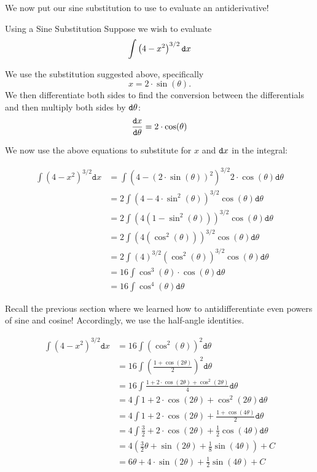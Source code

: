 We now put our sine substitution to use to evaluate an antiderivative!
\begin{example}{Using a Sine Substitution}
 Suppose we wish to evaluate $$\int \left( 4-x^2 \right)^{3/2} \mathop{}\!\mathtt{d} x$$
  
We use the substitution suggested above, specifically $$x=2\cdot \sin(\theta).$$  We then differentiate both sides to find the conversion between the differentials and then multiply both sides by $\mathop{}\!\mathtt{d} \theta$: $$ \frac{\mathop{}\!\mathtt{d} x}{\mathop{}\!\mathtt{d} \theta}=2 \cdot \cos(\theta) $$

We now use the above equations to substitute for $x$ and $\mathop{}\!\mathtt{d} x$ in the integral:

\begin{align*} \int \left( 4-x^2 \right)^{3/2} \mathtt{d}x &=\int \left( 4-(2\cdot \sin(\theta))^2 \right)^{3/2} 2\cdot \cos(\theta)\mathtt{d}\theta \\
&=2 \int \left(4-4\cdot \sin^2(\theta)\right)^{3/2}\cos(\theta) \mathtt{d}\theta \\
&=2 \int \left(4\left(1-\sin^2(\theta)\right)\right)^{3/2}\cos(\theta) \mathtt{d}\theta \\
&=2 \int \left(4\left(\cos^2(\theta)\right)\right)^{3/2}\cos(\theta) \mathtt{d}\theta \\
&=2 \int \left(4\right)^{3/2}\left(\cos^2(\theta)\right)^{3/2}\cos(\theta) \mathtt{d}\theta
\\
&=16 \int \cos^3(\theta)\cdot \cos(\theta) \mathtt{d}\theta
\\
&=16 \int \cos^4(\theta) \mathtt{d}\theta
\end{align*}

Recall the previous section where we learned how to antidifferentiate even powers of sine and cosine!  Accordingly, we use the half-angle identities.

\begin{align*} \int \left( 4-x^2 \right)^{3/2} \mathtt{d}x &=16 \int \left(\cos^2(\theta)\right)^2 \mathtt{d}\theta \\
&=16 \int \left(\frac{1+\cos(2\theta)}{2}\right)^2 \mathtt{d}\theta \\
&=16 \int \frac{1+2\cdot \cos(2\theta)+\cos^2(2\theta)}{4} \mathtt{d}\theta \\
&=4 \int 1+2\cdot \cos(2\theta)+\cos^2(2\theta) \mathtt{d}\theta \\
&=4 \int 1+2\cdot \cos(2\theta)+\frac{1+\cos(4\theta)}{2} \mathtt{d}\theta \\
&=4 \int \frac{3}{2}+2\cdot \cos(2\theta)+\frac{1}{2}\cos(4\theta) \mathtt{d}\theta \\
&=4 \left( \frac{3}{2}\theta +\sin(2\theta) +\frac{1}{8}\sin(4\theta) \right)+C \\
&=6\theta +4\cdot \sin(2\theta) +\frac{1}{2}\sin(4\theta)+C
\end{align*}


\end{example}
